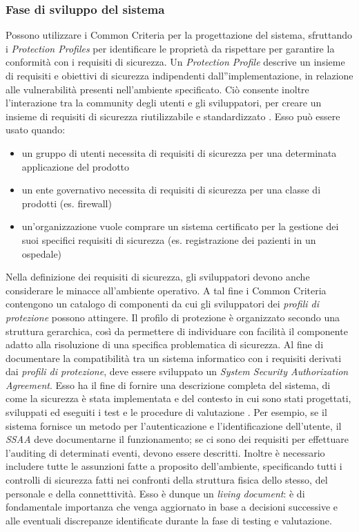 \documentclass[../main.tex]{subfiles}
\begin{document}
\subsubsection{Fase di sviluppo del sistema}
Possono utilizzare i Common Criteria per la progettazione del sistema, sfruttando i \textit{Protection Profiles} per identificare le proprietà da rispettare per garantire la conformità con i requisiti di sicurezza.
Un \textit{Protection Profile} descrive un insieme di requisiti e obiettivi di sicurezza indipendenti dall''implementazione, in relazione alle vulnerabilità presenti nell'ambiente specificato. Ciò consente inoltre l'interazione tra la community degli utenti e gli sviluppatori, per creare un insieme di requisiti di sicurezza riutilizzabile e standardizzato \cite{CommonCriteriaSans}.
Esso può essere usato quando:
\begin{itemize}
\item un gruppo di utenti necessita di requisiti di sicurezza per una determinata applicazione del prodotto
\item un ente governativo necessita di requisiti di sicurezza per una classe di prodotti (es. firewall)
\item un'organizzazione vuole comprare un sistema certificato per la gestione dei suoi specifici requisiti di sicurezza (es. registrazione dei pazienti in un ospedale)
\end{itemize}
Nella definizione dei requisiti di sicurezza, gli sviluppatori devono anche considerare le minacce all'ambiente operativo. A tal fine i Common Criteria contengono un catalogo di componenti da cui gli sviluppatori dei \textit{profili di protezione} possono attingere. Il profilo di protezione è organizzato secondo una struttura gerarchica, così da permettere di individuare con facilità il componente adatto alla risoluzione di una specifica problematica di sicurezza.
Al fine di documentare la compatibilità tra un sistema informatico con i requisiti derivati dai \textit{profili di protezione}, deve essere sviluppato un \textit{System Security Authorization Agreement}. Esso ha il fine di fornire una descrizione completa del sistema, di come la sicurezza è stata implementata e del contesto in cui sono stati progettati, sviluppati ed eseguiti i test e le procedure di valutazione \cite{CommonCriteriaSans}.
Per esempio, se il sistema fornisce un metodo per l'autenticazione e l'identificazione dell'utente, il \textit{SSAA} deve documentarne il funzionamento; se ci sono dei requisiti per effettuare l'auditing di determinati eventi, devono essere descritti.
Inoltre è necessario includere tutte le assunzioni fatte a proposito dell'ambiente, specificando tutti i controlli di sicurezza fatti nei confronti della struttura fisica dello stesso, del personale e della connetttività.
Esso è dunque un \textit{living document}: è di fondamentale importanza che venga aggiornato in base a decisioni successive e alle eventuali discrepanze identificate durante la fase di testing e valutazione.
\end{document}
